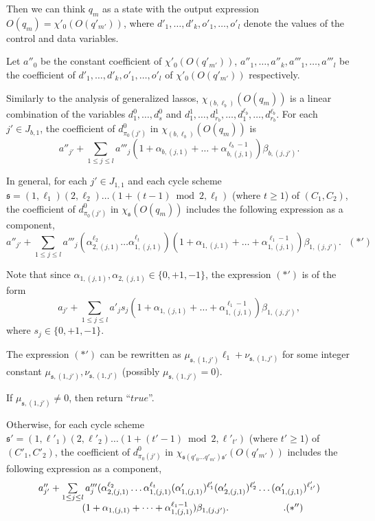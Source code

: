 \documentclass[runningheads,a4paper]{llncs}
\def\schm{{\mathfrak{s} }}
\begin{document}
Then we can think $q_m$ as a state with the output expression $O(q_m)=\chi'_{0}(O(q'_{m'}))$, where $d'_1,\dots,d'_k, o'_1,\dots, o'_l$ denote the values of the control and data variables. 

Let $a''_0$ be the constant coefficient of $\chi'_{0}(O(q'_{m'}))$, $a''_1,\dots,a''_k,a'''_1,\dots,a'''_l$ be the coefficient of $d'_1,\dots,d'_k,o'_1,\dots,o'_l$ of $\chi'_{0}(O(q'_{m'}))$ respectively.

Similarly to the analysis of generalized lassos, $\chi_{(b,\ell_b)}(O(q_m))$ is a linear combination of the variables $d^0_1,\dots, d^0_s$ and $d^1_1,\dots, d^1_{r_b}, \dots, d^{\ell_b}_1,\dots, d^{\ell_b}_{r_b}$. For each $j' \in J_{b,1}$, the coefficient of $d^0_{\pi_0(j')}$ in $\chi_{(b,\ell_b)}(O(q_m))$ is 
%
\[a''_{j'} + \sum \limits_{1 \le j \le l} a'''_j (1+\alpha_{b,(j,1)} + \dots +\alpha^{\ell_b-1}_{b,(j,1)})\beta_{b,(j,j')}.\]
%

In general, for each $j' \in J_{1,1}$ and each cycle scheme $\schm=(1,\ell_1)(2,\ell_2) \dots (1+(t-1) \bmod 2,\ell_{t})$ (where $t \ge 1$) of $(C_1,C_2)$, the coefficient of $d^0_{\pi_0(j')}$ in $\chi_{\schm}(O(q_m))$ includes the following expression as a component,
%
\[a''_{j'} + \sum \limits_{1 \le j \le l} a'''_j (\alpha^{\ell_2}_{2,(j,1)} \dots \alpha^{\ell_t}_{1,(j,1)}) (1+\alpha_{1,(j,1)} + \dots +\alpha^{\ell_1-1}_{1,(j,1)})\beta_{1,(j,j')}. \ \ \  (\ast')\]

Note that since $\alpha_{1,(j,1)},\alpha_{2,(j,1)} \in \{0,+1,-1\}$, the expression $(\ast')$ is of the form 
\[a_{j'} + \sum \limits_{1 \le j \le l} a'_j  s_j (1+\alpha_{1,(j,1)} + \dots +\alpha^{\ell_1-1}_{1,(j,1)})\beta_{1,(j,j')},\]
where $s_j \in \{0,+1,-1\}$.

The expression $(\ast')$ can be rewritten as $\mu_{\schm,(1,j')} \ell_1 + \nu_{\schm,(1,j')}$ for some integer constant $\mu_{\schm,(1,j')},\nu_{\schm,(1,j')}$ (possibly $\mu_{\schm,(1,j')}=0$). 

If $\mu_{\schm,(1,j')} \neq 0$, then return ``$true$''. 

Otherwise, for each cycle scheme $\schm'=(1,\ell'_1)(2,\ell'_2) \dots (1+(t'-1) \bmod 2,\ell'_{t'})$ (where $t' \ge 1$) of $(C'_1,C'_2)$, the coefficient of $d^0_{\pi_0(j')}$ in $\chi_{\schm (q'_0 \dots q'_{m'})\schm'}(O(q'_{m'}))$ includes the following expression as a component,
\[
\begin{array}{l c l}
a''_{j'} + \sum \limits_{1 \le j \le l} a'''_j (\alpha^{\ell_2}_{2,(j,1)} \dots \alpha^{\ell_t}_{1,(j,1)} (\alpha'_{1,(j,1)})^{\ell'_{1}} (\alpha'_{2,(j,1)})^{\ell'_{2}} \dots (\alpha'_{1,(j,1)})^{\ell'_{t'}}) \\
\hspace{16mm} (1+\alpha_{1,(j,1)} + \dots +\alpha^{\ell_1-1}_{1,(j,1)})\beta_{1,(j,j')}. \hspace{2cm}. (\ast'')
\end{array}
\]
\end{document}
